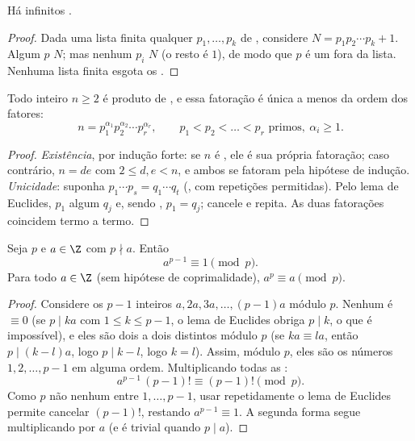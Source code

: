 \begin{theorem}[Euclides]\label{thm:g12:arith:infiniteprimes}
Há infinitos .
\end{theorem}

\begin{proof}
Dada uma lista finita qualquer $p_1, \dots, p_k$ de , considere
$N = p_1 p_2 \cdots p_k + 1$. Algum  $p$  $N$; mas nenhum $p_i$
 $N$ (o resto é $1$), de modo que $p$ é um  fora da lista.
Nenhuma lista finita esgota os .
\end{proof}

\begin{theorem}\label{thm:g12:arith:fta}
Todo inteiro $n \geq 2$ é produto de , e essa fatoração é única a
menos da ordem dos fatores:
\[
n = p_1^{\alpha_1} p_2^{\alpha_2} \cdots p_r^{\alpha_r},
\qquad p_1 < p_2 < \dots < p_r \text{ primos},\ \alpha_i \geq 1 .
\]
\end{theorem}

\begin{proof}
\emph{Existência}, por indução forte: se $n$ é , ele é sua própria
fatoração; caso contrário, $n = de$ com $2 \leq d, e < n$, e ambos se
fatoram pela hipótese de indução. \emph{Unicidade}: suponha
$p_1\cdots p_s = q_1 \cdots q_t$ (, com repetições permitidas). Pelo
lema de Euclides, $p_1$  algum $q_j$ e, sendo , $p_1 = q_j$;
cancele e repita. As duas fatorações coincidem termo a termo.
\end{proof}

\begin{theorem}\label{thm:g12:arith:fermat}
Seja $p$  e $a \in \Z$ com $p \nmid a$. Então
\[
a^{p-1} \equiv 1 \pmod p .
\]
Para todo $a \in \Z$ (sem hipótese de coprimalidade),
$a^p \equiv a \pmod p$.
\end{theorem}

\begin{proof}
Considere os $p - 1$ inteiros $a, 2a, 3a, \dots, (p-1)a$ módulo $p$.
Nenhum é $\equiv 0$ (se $p \mid ka$ com $1 \leq k \leq p-1$, o lema de
Euclides obriga $p \mid k$, o que é impossível), e eles são dois a dois
distintos módulo $p$ (se $ka \equiv la$, então $p \mid (k - l)a$, logo
$p \mid k - l$, logo $k = l$). Assim, módulo $p$, eles são os números
$1, 2, \dots, p-1$ em alguma ordem. Multiplicando todas as :
\[
a^{p-1}\,(p-1)! \equiv (p-1)! \pmod p .
\]
Como $p$ não  nenhum entre $1, \dots, p-1$, usar repetidamente o
lema de Euclides permite cancelar $(p-1)!$, restando
$a^{p-1} \equiv 1$. A segunda forma segue multiplicando por $a$ (e é
trivial quando $p \mid a$).
\end{proof}

